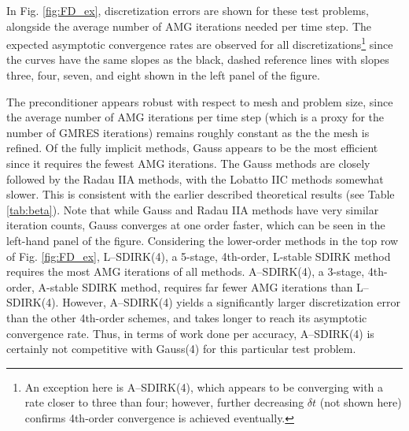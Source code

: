 \documentclass[review]{siamart}
\begin{document}
In Fig. \ref{fig:FD_ex}, discretization errors are shown for these test problems, alongside the average number of AMG iterations needed per time step. The expected asymptotic convergence rates are observed for all discretizations\footnote{An exception here is A--SDIRK(4), which appears to be converging with a rate closer to three than four; however, further decreasing $\delta t$ (not shown here) confirms 4th-order convergence is achieved eventually.} since the curves have the same slopes as the black, dashed reference lines with slopes three, four, seven, and eight shown in the left panel of the figure. 

The preconditioner appears robust with respect to mesh and problem size, since the average number of AMG iterations per time step (which is a proxy for the number of GMRES iterations) remains roughly constant as the the mesh is refined.
%
Of the fully implicit methods, Gauss appears to be the most efficient since it requires the fewest AMG iterations. The Gauss methods are closely followed by the Radau IIA methods, with the Lobatto IIC methods somewhat slower. This is consistent with the earlier described theoretical results (see Table \ref{tab:beta}). Note that while Gauss and Radau IIA methods have very similar iteration counts, Gauss converges at one order faster, which can be seen in the left-hand panel of the figure.
%
Considering the lower-order methods in the top row of Fig. \ref{fig:FD_ex}, L--SDIRK(4), a 5-stage, 4th-order, L-stable SDIRK method requires the most AMG iterations of all methods. A--SDIRK(4), a 3-stage, 4th-order, A-stable SDIRK method, requires far fewer AMG iterations than L--SDIRK(4).  However, A--SDIRK(4) yields a significantly larger discretization error than the other 4th-order schemes, and takes longer to reach its asymptotic convergence rate. Thus, in terms of work done per accuracy, A--SDIRK(4) is certainly not competitive with Gauss(4) for this particular test problem.
\end{document}
